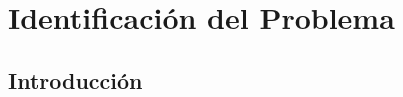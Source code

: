 \documentclass{report}
\makeatletter
\let\thedate\@date
\makeatother
\begin{document}
\begin{titlepage}
	{\large \thedate}\\[2 cm]
 
	\vfill
	
\end{titlepage}


\tableofcontents
\pagebreak
\pagebreak

\newpage

\chapter{Identificación del Problema}
    
    \section{Introducción}
\end{document}
